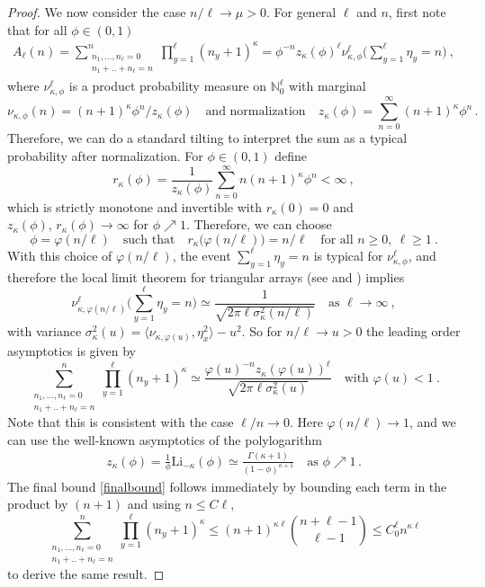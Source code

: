 \documentclass[pdflatex,sn-mathphys-num]{sn-jnl}%
\theoremstyle{thmstyleone}%
\theoremstyle{thmstyletwo}%
\theoremstyle{thmstylethree}%
\begin{document}
\begin{proof}
We now consider the case $n/\ell \to \mu > 0$. For general $\ell$ and $n$, first note that for all $\phi\in (0,1)$
\begin{align}
    \label{eq:tilttwo}
A_\ell(n)=\sum_{\substack{n_1 ,\ldots ,n_\ell =0\\ n_1 +..+n_\ell =n}}^n \prod_{y=1}^\ell(n_y + 1)^\kappa =\phi^{-n} z_\kappa (\phi )^\ell \nu_{\kappa ,\phi }^{\ell} \Big(\sum_{y=1}^\ell \eta_y =n\Big)\ ,
\end{align}
where $\nu_{\kappa ,\phi}^{\ell}$ is a product probability measure on $\mathbb{N}_0^\ell$ with marginal 
\begin{equation}\label{zkappa}
    \nu_{\kappa ,\phi} (n)=(n+1)^\kappa \phi^n /z_\kappa (\phi ) \quad\mbox{and normalization}\quad z_\kappa (\phi )=\sum_{n=0}^\infty (n+1)^\kappa \phi^n  \,.
\end{equation}
Therefore, we can do a standard tilting to interpret the sum as a typical probability after normalization. For $\phi \in (0,1)$ define
\[
r_\kappa (\phi )=\frac{1}{z_\kappa (\phi )} \sum_{n=0}^\infty n(n+1)^\kappa \phi^n< \infty\ ,
\]
which is strictly monotone and invertible with $r_\kappa (0)=0$ and $z_\kappa (\phi ),\, r_\kappa (\phi )\to\infty$ for $\phi\nearrow 1$. Therefore, we can choose
\[
\phi =\varphi (n/\ell )\quad\mbox{such that}\quad r_\kappa \big(\varphi (n/\ell )\big) =n/\ell\quad\mbox{for all }n\geq 0,\ \ell\geq 1\ .
\]
With this choice of $\varphi (n/\ell )$, the event $\sum_{y=1}^\ell \eta_y =n$ is typical for $\nu_{\kappa ,\phi}^{\ell}$, and therefore the local limit theorem for triangular arrays (see \cite{bib_DM95} and \cite[Proposition A.1]{bib_CGG22}) implies
\[
\nu_{\kappa ,\varphi (n/\ell )}^{\ell} \Big(\sum_{y=1}^\ell \eta_y =n\Big) \simeq \frac{1}{\sqrt{2\pi \ell\sigma_\kappa^2 (n/\ell )}}\quad\mbox{as }\ell\to\infty\ ,
\]
with variance $\sigma_\kappa^2 (u) =\langle\nu_{\kappa ,\varphi (u)} ,\eta_x^2 \rangle -u^2$. So for $n/\ell \to u>0$ the leading order asymptotics is given by
\[
\sum_{\substack{n_1 ,\ldots ,n_\ell =0\\ n_1 +..+n_\ell =n}}^n \prod_{y=1}^\ell(n_y + 1)^\kappa \simeq\frac{\varphi (u)^{-n} z_\kappa (\varphi (u))^\ell}{\sqrt{2\pi \ell\sigma_\kappa^2 (u)}}\quad\mbox{with }\varphi (u)<1\ . 
\]
Note that this is consistent with the case $\ell /n\to 0$. Here $\varphi (n/\ell )\to 1$, and we can use the well-known asymptotics of the polylogarithm
\begin{align}
    \label{eq:polylog}
    z_\kappa (\phi )=\frac{1}{\phi}\mathrm{Li}_{-\kappa} (\phi )\simeq \frac{\Gamma (\kappa +1)}{(1-\phi )^{\kappa +1}}\quad \mbox{as }\phi\nearrow 1\,.
\end{align}
The final bound \eqref{finalbound} follows immediately by bounding each term in the product by $(n+1)$ and using $n \leq C\ell$,
\[
\sum_{\substack{n_1 ,\ldots ,n_\ell =0\\ n_1 +..+n_\ell =n}}^n \prod_{y=1}^\ell(n_y + 1)^\kappa \leq (n+1)^{\kappa \ell}\binom{n+\ell-1}{\ell-1} \leq C_0^\ell n^{\kappa \ell}
\]
to derive the same result.
\end{proof}
\end{document}
